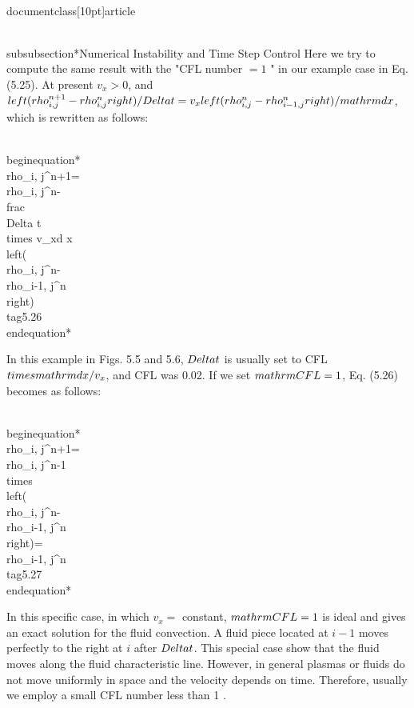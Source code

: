 \\documentclass[10pt]{article}
\begin{document}
{\\subsubsection*{Numerical Instability and Time Step Control}
Here we try to compute the same result with the "CFL number $=1$ " in our example case in Eq. (5.25). At present $v_{x}>0$, and $\\left(\\rho_{i, j}^{n+1}-\\rho_{i, j}^{n}\\right) / \\Delta t=v_{x}\\left(\\rho_{i, j}^{n}-\\rho_{i-1, j}^{n}\\right) / \\mathrm{d} x$, which is rewritten as follows:


\\begin{equation*}
\\rho_{i, j}^{n+1}=\\rho_{i, j}^{n}-\\frac{\\Delta t \\times v_{x}}{d x}\\left(\\rho_{i, j}^{n}-\\rho_{i-1, j}^{n}\\right) \\tag{5.26}
\\end{equation*}


In this example in Figs. 5.5 and 5.6, $\\Delta t$ is usually set to CFL $\\times \\mathrm{d} x / v_{x}$, and CFL was 0.02. If we set $\\mathrm{CFL}=1$, Eq. (5.26) becomes as follows:


\\begin{equation*}
\\rho_{i, j}^{n+1}=\\rho_{i, j}^{n}-1 \\times\\left(\\rho_{i, j}^{n}-\\rho_{i-1, j}^{n}\\right)=\\rho_{i-1, j}^{n} \\tag{5.27}
\\end{equation*}


In this specific case, in which $v_{x}=$ constant, $\\mathrm{CFL}=1$ is ideal and gives an exact solution for the fluid convection. A fluid piece located at $i-1$ moves perfectly to the right at $i$ after $\\Delta t$. This special case show that the fluid moves along the fluid characteristic line. However, in general plasmas or fluids do not move uniformly in space and the velocity depends on time. Therefore, usually we employ a small CFL number less than 1 .

}
\end{document}
